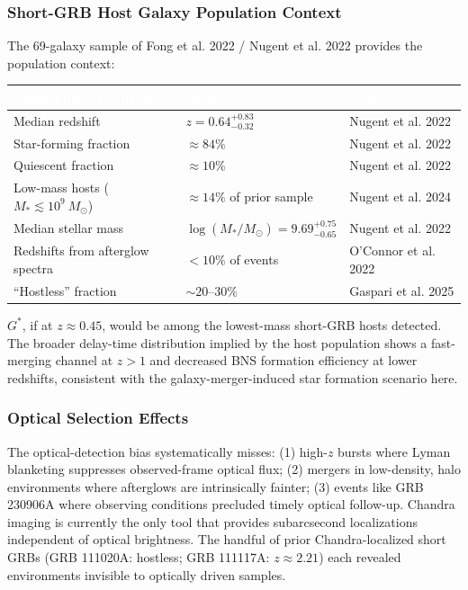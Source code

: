 \documentclass[11pt,letterpaper]{article}
\newcommand{\tableheader}[1]{\textbf{\sffamily\textcolor{white}{#1}}}
\begin{document}
\subsubsection{Short-GRB Host Galaxy Population Context}

The 69-galaxy sample of Fong et al. 2022 / Nugent et al. 2022 provides the population context:

\begin{center}
\begin{tabularx}{\textwidth}{L{4.5cm}XC{3cm}}
\toprule
{}
\tableheader{Population Parameter} & \tableheader{Value} & \tableheader{Reference} \\
\midrule
Median redshift & $z = 0.64^{+0.83}_{-0.32}$ & Nugent et al. 2022 \\
Star-forming fraction & $\approx 84\%$ & Nugent et al. 2022 \\
Quiescent fraction & $\approx 10\%$ & Nugent et al. 2022 \\
Low-mass hosts ($M_* \lesssim 10^9~M_\odot$) & $\approx 14\%$ of prior sample & Nugent et al. 2024 \\
Median stellar mass & $\log(M_*/M_\odot) = 9.69^{+0.75}_{-0.65}$ & Nugent et al. 2022 \\
Redshifts from afterglow spectra & $< 10\%$ of events & O'Connor et al. 2022 \\
``Hostless'' fraction & $\sim 20$--$30\%$ & Gaspari et al. 2025 \\
\bottomrule
\end{tabularx}
\end{center}

$G^*$, if at $z \approx 0.45$, would be among the lowest-mass short-GRB hosts detected. The broader delay-time distribution implied by the host population shows a fast-merging channel at $z > 1$ and decreased BNS formation efficiency at lower redshifts, consistent with the galaxy-merger-induced star formation scenario here.

\subsubsection{Optical Selection Effects}

The optical-detection bias systematically misses: (1) high-$z$ bursts where Lyman blanketing suppresses observed-frame optical flux; (2) mergers in low-density, halo environments where afterglows are intrinsically fainter; (3) events like GRB 230906A where observing conditions precluded timely optical follow-up. Chandra imaging is currently the only tool that provides subarcsecond localizations independent of optical brightness. The handful of prior Chandra-localized short GRBs (GRB 111020A: hostless; GRB 111117A: $z \approx 2.21$) each revealed environments invisible to optically driven samples.
\end{document}
